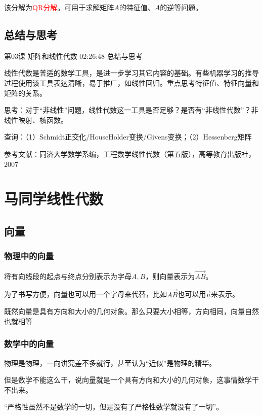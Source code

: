 \documentclass[UTF8]{ctexart}
\begin{document}
该分解为\textcolor{red}{QR分解}。可用于求解矩阵$A$的特征值、$A$的逆等问题。

\subsection{总结与思考}

第03课 矩阵和线性代数 02:26:48 总结与思考

线性代数是普适的数学工具，是进一步学习其它内容的基础。有些机器学习的推导过程使用该工具表达清晰，易于推广，如线性回归。重点思考特征值、特征向量和矩阵的关系。

思考：对于“非线性”问题，线性代数这一工具是否足够？是否有“非线性代数”？非线性映射、核函数。

查询：（1）Schmidt正交化/HouseHolder变换/Givens变换；（2）Hessenberg矩阵

参考文献：同济大学数学系编，工程数学线性代数（第五版），高等教育出版社，2007


\newpage

\section{马同学线性代数}

\subsection{向量}

\subsubsection{物理中的向量}

将有向线段的起点与终点分别表示为字母$A,B$，则向量表示为$\overrightarrow{AB}$。

为了书写方便，向量也可以用一个字母来代替，比如$\overrightarrow{AB}$也可以用$\vec{u}$来表示。

既然向量是具有方向和大小的几何对象。那么只要大小相等，方向相同，向量自然也就相等

\subsubsection{数学中的向量}

物理是物理，一向讲究差不多就行，甚至认为“近似”是物理的精华。

但是数学不能这么干，说向量就是一个具有方向和大小的几何对象，这事情数学干不出来。

“严格性虽然不是数学的一切，但是没有了严格性数学就没有了一切”。
\end{document}
